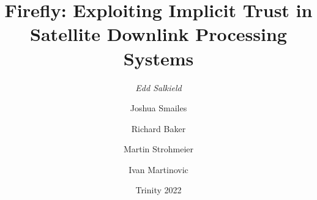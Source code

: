 \documentclass{beamer}
\begin{document}
\title{Firefly: Exploiting Implicit Trust in Satellite Downlink Processing Systems}
\author[Edd Salkield]{
  \emph{Edd Salkield}
  \and
  \huge Joshua Smailes
  \and
  \normalsize
  Richard Baker
  \and
  Martin Strohmeier
  \and
  Ivan Martinovic
}
\date{Trinity 2022}

\begin{frame}
  \titlepage
\end{frame}



\end{document}
